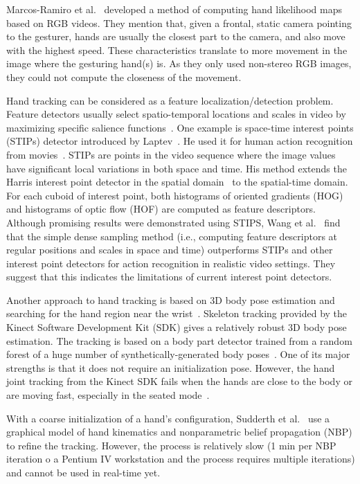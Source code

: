 Marcos-Ramiro et al.~\cite{marcos2013} developed a method of computing hand likelihood maps based on RGB videos. They mention that, given a frontal, static camera pointing to the gesturer, hands are usually the closest
part to the camera, and also move with the highest speed. These characteristics translate to more movement in the image where
the gesturing hand(s) is. As they only used non-stereo RGB images, they could
not compute the closeness of the movement.

Hand tracking can be considered as a feature localization/detection
problem. Feature detectors usually select spatio-temporal
locations and scales in video by maximizing specific
salience functions~\cite{wang-spatio-09}. One example is space-time interest
points (STIPs) detector introduced by Laptev~\cite{laptev03}. He used it for human
action recognition from movies~\cite{laptev08}.
STIPs are points in the video sequence where the image values have significant local variations in both space and time. His method extends the Harris interest point detector in the spatial domain~\cite{Harris88} to the spatial-time domain. For each cuboid of interest point, both histograms of oriented gradients (HOG) and histograms of optic flow (HOF) are computed as feature descriptors.
Although promising results were demonstrated using STIPS, Wang et
al.~\cite{wang-spatio-09} find that the simple dense sampling method
(i.e., computing feature descriptors at regular positions and scales in space
and time) outperforms STIPs and other interest point detectors for action
recognition in realistic video settings.
They suggest that this indicates the limitations of current interest point detectors.

Another approach to hand tracking is based on 3D body pose estimation and searching for the hand region near the wrist~\cite{song11}.
Skeleton tracking provided by the Kinect Software Development Kit (SDK) gives a relatively robust 3D body pose estimation. The tracking
is based on a body part detector trained from a random forest of a huge number
of synthetically-generated body poses~\cite{shotton13}. One of its major
strengths is that it does not require an initialization pose. 
However, the hand joint tracking
from the Kinect SDK fails when the hands are close to the body or are moving
fast, especially in the seated mode~\cite{yin13}.

With a coarse initialization of a hand's configuration, Sudderth et
al.~\cite{sudderth04} use a graphical model of hand kinematics and nonparametric
belief propagation (NBP) to refine the tracking. However, the process is
relatively slow (1 min per NBP iteration o a Pentium IV workstation and the
process requires multiple iterations) and cannot be used in real-time yet. 

